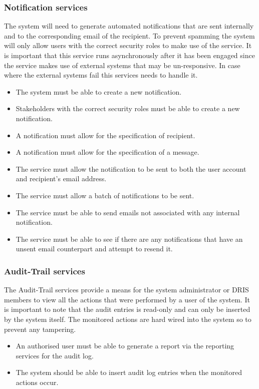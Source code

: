 \documentclass[12pt]{article}
\begin{document}
\subsubsection{Notification services}
	The system will need to generate automated notifications that are sent internally and to the corresponding email of the recipient. To prevent spamming the system will only allow users with the correct security roles to make use of the service. It is important that this service runs asynchronously after it has been engaged since the service makes use of external systems that may be un-responsive. In case where the external systems fail this services needs to handle it. 
	\begin{itemize}
		\item The system must be able to create a new notification.
		\item Stakeholders with the correct security roles must be able to create a new notification.
		\item A notification must allow for the specification of recipient.
		\item A notification must allow for the specification of a message.
		\item The service must allow the notification to be sent to both the user account and recipient's email address.
		\item The service must allow a batch of notifications to be sent.
		\item The service must be able to send emails not associated with any internal notification.
		\item The service must be able to see if there are any notifications that have an unsent email counterpart and attempt to resend it.
	\end{itemize}

\subsubsection{Audit-Trail services}
	The Audit-Trail services provide a means for the system administrator or DRIS members to view all the actions that were performed by a user of the system. It is important to note that the audit entries is read-only and can only be inserted by the system itself. The monitored actions are hard wired into the system so to prevent any tampering.
	\begin{itemize}
		\item An authorised user must be able to generate a report via the reporting services for the audit log.
		\item The system should be able to insert audit log entries when the monitored actions occur.
	\end{itemize}
\end{document}
